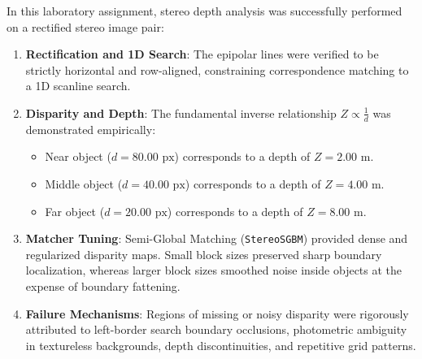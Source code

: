 \documentclass[12pt]{article}
\begin{document}
In this laboratory assignment, stereo depth analysis was successfully performed on a rectified stereo image pair:
\begin{enumerate}
    \item \textbf{Rectification and 1D Search}: The epipolar lines were verified to be strictly horizontal and row-aligned, constraining correspondence matching to a 1D scanline search.
    \item \textbf{Disparity and Depth}: The fundamental inverse relationship $Z \propto \frac{1}{d}$ was demonstrated empirically:
    \begin{itemize}
        \item Near object ($d = 80.00\text{ px}$) corresponds to a depth of $Z = 2.00\text{ m}$.
        \item Middle object ($d = 40.00\text{ px}$) corresponds to a depth of $Z = 4.00\text{ m}$.
        \item Far object ($d = 20.00\text{ px}$) corresponds to a depth of $Z = 8.00\text{ m}$.
    \end{itemize}
    \item \textbf{Matcher Tuning}: Semi-Global Matching (\texttt{StereoSGBM}) provided dense and regularized disparity maps. Small block sizes preserved sharp boundary localization, whereas larger block sizes smoothed noise inside objects at the expense of boundary fattening.
    \item \textbf{Failure Mechanisms}: Regions of missing or noisy disparity were rigorously attributed to left-border search boundary occlusions, photometric ambiguity in textureless backgrounds, depth discontinuities, and repetitive grid patterns.
\end{enumerate}
\end{document}
